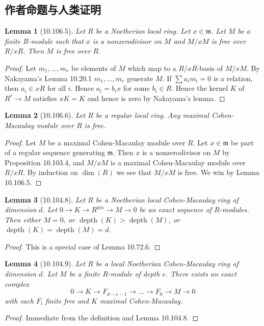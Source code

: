 \documentclass[UTF8,11pt]{ctexart}
\newtheorem*{lemma}{Lemma}
\theoremstyle{definition}
\begin{document}
\subsection*{作者命题与人类证明}
\begin{lemma}[10.106.5]
Let $R$ be a Noetherian local ring. Let $x\in\mathfrak m$. Let $M$ be a finite $R$-module such that $x$ is a nonzerodivisor on $M$ and $M/xM$ is free over $R/xR$. Then $M$ is free over $R$.
\end{lemma}
\begin{proof}
Let $m_1,\ldots,m_r$ be elements of $M$ which map to a $R/xR$-basis of $M/xM$. By Nakayama's Lemma 10.20.1 $m_1,\ldots,m_r$ generate $M$. If $\sum a_im_i=0$ is a relation, then $a_i\in xR$ for all $i$. Hence $a_i=b_ix$ for some $b_i\in R$. Hence the kernel $K$ of $R^r\to M$ satisfies $xK=K$ and hence is zero by Nakayama's lemma.
\end{proof}
\begin{lemma}[10.106.6]
Let $R$ be a regular local ring. Any maximal Cohen-Macaulay module over $R$ is free.
\end{lemma}
\begin{proof}
Let $M$ be a maximal Cohen-Macaulay module over $R$. Let $x\in\mathfrak m$ be part of a regular sequence generating $\mathfrak m$. Then $x$ is a nonzerodivisor on $M$ by Proposition 10.103.4, and $M/xM$ is a maximal Cohen-Macaulay module over $R/xR$. By induction on $\dim(R)$ we see that $M/xM$ is free. We win by Lemma 10.106.5.
\end{proof}
\begin{lemma}[10.104.8]
Let $R$ be a Noetherian local Cohen-Macaulay ring of dimension $d$. Let $0\to K\to R^{\oplus n}\to M\to0$ be an exact sequence of $R$-modules. Then either $M=0$, or $\operatorname{depth}(K)>\operatorname{depth}(M)$, or $\operatorname{depth}(K)=\operatorname{depth}(M)=d$.
\end{lemma}
\begin{proof}
This is a special case of Lemma 10.72.6.
\end{proof}
\begin{lemma}[10.104.9]
Let $R$ be a local Noetherian Cohen-Macaulay ring of dimension $d$. Let $M$ be a finite $R$-module of depth $e$. There exists an exact complex
\[
0\to K\to F_{d-e-1}\to\ldots\to F_0\to M\to0
\]
with each $F_i$ finite free and $K$ maximal Cohen-Macaulay.
\end{lemma}
\begin{proof}
Immediate from the definition and Lemma 10.104.8.
\end{proof}
\end{document}
